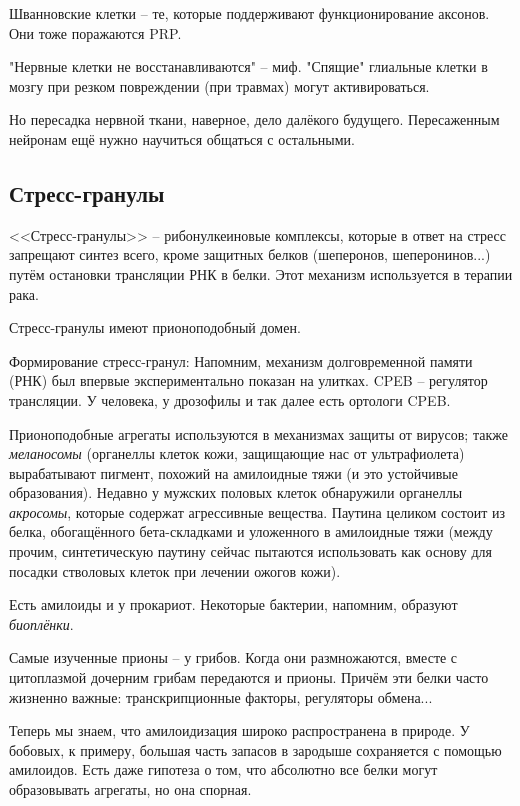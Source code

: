 \documentclass[main.tex]{subfiles}
\begin{document}
Шванновские клетки -- те, которые поддерживают функционирование аксонов.
Они тоже поражаются PRP.

\begin{leftbar}
"Нервные клетки не восстанавливаются"\hspace{0pt} -- миф.
"Спящие"\hspace{0pt} глиальные клетки в мозгу при резком повреждении (при травмах) могут активироваться.

Но пересадка нервной ткани, наверное, дело далёкого будущего.
Пересаженным нейронам ещё нужно научиться общаться с остальными.
\end{leftbar}

\subsection{Стресс-гранулы}

<<Стресс-гранулы>> -- рибонулкеиновые комплексы, которые в ответ на стресс запрещают синтез всего, кроме защитных белков (шеперонов, шеперонинов...) путём остановки трансляции РНК в белки.
Этот механизм используется в терапии рака.

Стресс-гранулы имеют прионоподобный домен.

Формирование стресс-гранул:
Напомним, механизм долговременной памяти (РНК) был впервые экспериментально показан на улитках.
CPEB -- регулятор трансляции.
У человека, у дрозофилы и так далее есть ортологи CPEB.

Прионоподобные агрегаты используются в механизмах защиты от вирусов; также \emph{меланосомы} (органеллы клеток кожи, защищающие нас от ультрафиолета) вырабатывают пигмент, похожий на амилоидные тяжи (и это устойчивые образования).
Недавно у мужских половых клеток обнаружили органеллы  \emph{акросомы}, которые содержат агрессивные вещества.
Паутина целиком состоит из белка, обогащённого бета-складками и уложенного в амилоидные тяжи (между прочим, синтетическую паутину сейчас пытаются использовать как основу для посадки стволовых клеток при лечении ожогов кожи).

Есть амилоиды и у прокариот.
Некоторые бактерии, напомним, образуют \emph{биоплёнки}.

Самые изученные прионы -- у грибов.
Когда они размножаются, вместе с цитоплазмой дочерним грибам передаются и прионы.
Причём эти белки часто жизненно важные: транскрипционные факторы, регуляторы обмена...

Теперь мы знаем, что амилоидизация широко распространена в природе.
У бобовых, к примеру, большая часть запасов в зародыше сохраняется с помощью амилоидов.
Есть даже гипотеза о том, что абсолютно все белки могут образовывать агрегаты, но она спорная.
\end{document}
